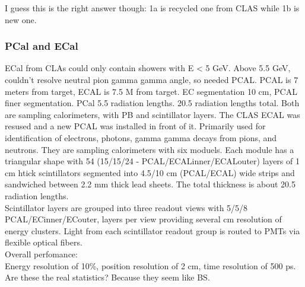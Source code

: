 I guess this is the right answer though:
1a is recycled one from CLAS while 1b is new one.
            
            
        \subsubsection{PCal and ECal}
            ECal from CLAs could only contain showers with E < 5 GeV. Above 5.5 GeV, couldn't resolve neutral pion gamma gamma angle, so needed PCAL. PCAL is 7 meters from target, ECAL is 7.5 M from target. EC segmentation 10 cm, PCAL finer segmentation. PCal 5.5 radiation lengths. 20.5 radiation lengths total. Both are sampling calorimeters, with PB and scintillator layers. The CLAS ECAL was resused and a new PCAL was installed in front of it. Primarily used for identification of electrons, photons, gamma gamma decays from pions, and neutrons. They are sampling calorimeters with six moduels. Each module has a triangular shape with 54 (15/15/24 - PCAL/ECALinner/ECALouter) layers of 1 cm htick scintillators segmented into 4.5/10 cm (PCAL/ECAL) wide strips and sandwiched between 2.2 mm thick lead sheets. The total thickness is about 20.5 radiation lengths. \\
            \indent Scintillator layers are grouped into three readout views with 5/5/8 PCAL/ECinner/ECouter, layers per view providing several cm resolution of energy clusters. Light from each scintillator readout group is routed to PMTs via flexible optical fibers.\\
            Overall perfomance:\\
            Energy resolution of 10\%, position resolution of 2 cm, time resolution of 500 ps. \\
            Are these the real statistics? Because they seem like BS.
            
            
            
